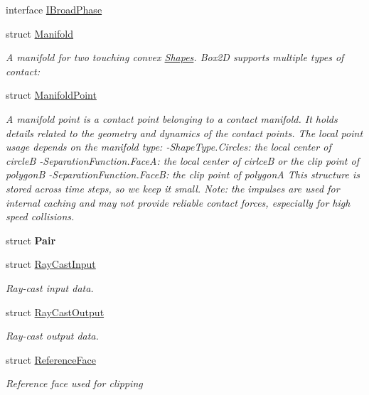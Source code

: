 \begin{DoxyCompactItemize}
interface \hyperlink{interface_farseer_physics_1_1_collision_1_1_i_broad_phase}{I\+Broad\+Phase}
\item 
struct \hyperlink{struct_farseer_physics_1_1_collision_1_1_manifold}{Manifold}
\begin{DoxyCompactList}\small\item\em A manifold for two touching convex \hyperlink{namespace_farseer_physics_1_1_collision_1_1_shapes}{Shapes}. Box2\+D supports multiple types of contact\+: \end{DoxyCompactList}\item 
struct \hyperlink{struct_farseer_physics_1_1_collision_1_1_manifold_point}{Manifold\+Point}
\begin{DoxyCompactList}\small\item\em A manifold point is a contact point belonging to a contact manifold. It holds details related to the geometry and dynamics of the contact points. The local point usage depends on the manifold type\+: -\/\+Shape\+Type.\+Circles\+: the local center of circle\+B -\/\+Separation\+Function.\+Face\+A\+: the local center of cirlce\+B or the clip point of polygon\+B -\/\+Separation\+Function.\+Face\+B\+: the clip point of polygon\+A This structure is stored across time steps, so we keep it small. Note\+: the impulses are used for internal caching and may not provide reliable contact forces, especially for high speed collisions. \end{DoxyCompactList}\item 
struct {\bfseries Pair}
\item 
struct \hyperlink{struct_farseer_physics_1_1_collision_1_1_ray_cast_input}{Ray\+Cast\+Input}
\begin{DoxyCompactList}\small\item\em Ray-\/cast input data. \end{DoxyCompactList}\item 
struct \hyperlink{struct_farseer_physics_1_1_collision_1_1_ray_cast_output}{Ray\+Cast\+Output}
\begin{DoxyCompactList}\small\item\em Ray-\/cast output data. \end{DoxyCompactList}\item 
struct \hyperlink{struct_farseer_physics_1_1_collision_1_1_reference_face}{Reference\+Face}
\begin{DoxyCompactList}\small\item\em Reference face used for clipping \end{DoxyCompactList}\item 

\end{DoxyCompactItemize}

